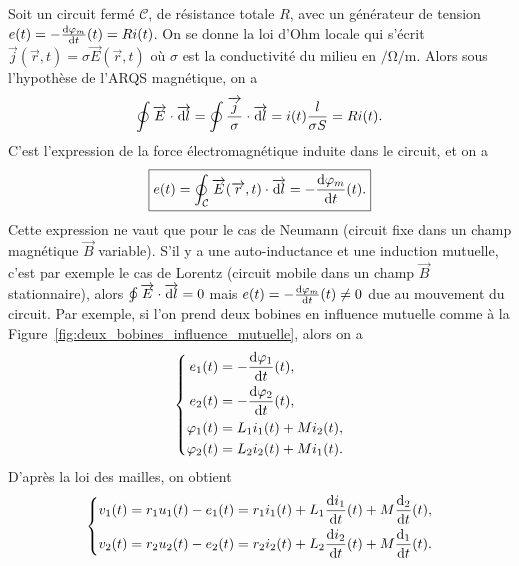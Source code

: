 Soit un circuit fermé $\mathcal{C}$, de résistance totale $R$, avec un générateur de tension $e(t)=-\frac{\mathrm{d}\varphi_m}{\mathrm{d} t}(t)=Ri(t)$. On se donne la loi d'Ohm locale qui s'écrit $\vec{j}(\vec{r},t)=\sigma\vec{E}(\vec{r},t)$ où $\sigma$ est la conductivité du milieu en $\si{\per\ohm\per\metre}$. Alors sous l'hypothèse de l'ARQS magnétique, on a 
\begin{equation}
    \oint\protect\overrightarrow{{E}}\cdot\protect\overrightarrow{{\mathrm{d} l}}=\oint\frac{\protect\overrightarrow{{j}}}{\sigma}\cdot\protect\overrightarrow{{\mathrm{d} l}}=i(t)\frac{l}{\sigma S}=Ri(t).
\end{equation}
C'est l'expression de la force électromagnétique induite dans le circuit, et on a
\begin{equation}
    \boxed{
        e(t)=\oint_{\mathcal{C}}\protect\overrightarrow{{E}}(\protect\overrightarrow{{r}},t)\cdot\protect\overrightarrow{{\mathrm{d} l}}=-\frac{\mathrm{d}\varphi_m}{\mathrm{d} t}(t).
    }
\end{equation}
Cette expression ne vaut que pour le cas de Neumann (circuit fixe dans un champ magnétique $\vec{B}$ variable). S'il y a une auto-inductance et une induction mutuelle, c'est par exemple le cas de Lorentz (circuit mobile dans un champ $\vec{B}$ stationnaire), alors $\oint\protect\overrightarrow{{E}}\cdot\protect\overrightarrow{{\mathrm{d} l}}=0$ mais $e(t)=-\frac{\mathrm{d}\varphi_m}{\mathrm{d} t}(t)\neq0$ due au mouvement du circuit.
Par exemple, si l'on prend deux bobines en influence mutuelle comme à la Figure~\ref{fig:deux_bobines_influence_mutuelle}, alors on a 
\begin{equation}
    \left\lbrace
        \begin{aligned}
            e_1(t)&=-\frac{\mathrm{d}\varphi_1}{\mathrm{d} t}(t),\\
            e_2(t)&=-\frac{\mathrm{d}\varphi_2}{\mathrm{d} t}(t),\\
            \varphi_1(t)&=L_1 i_1(t)+Mi_2(t),\\
            \varphi_2(t)&=L_2 i_2(t)+Mi_1(t).
        \end{aligned}
    \right.
\end{equation}
D'après la loi des mailles, on obtient
\begin{equation}
    \left\lbrace
        \begin{aligned}
            v_1(t)&=r_1 u_1(t)-e_1(t)=r_1 i_1(t)+L_1\frac{\mathrm{d} i_1}{\mathrm{d} t}(t)+M\frac{\mathrm{d} _2}{\mathrm{d} t}(t),\\
            v_2(t)&=r_2 u_2(t)-e_2(t)=r_2 i_2(t)+L_2\frac{\mathrm{d} i_2}{\mathrm{d} t}(t)+M\frac{\mathrm{d} _1}{\mathrm{d} t}(t).
        \end{aligned}
    \right.
\end{equation}
